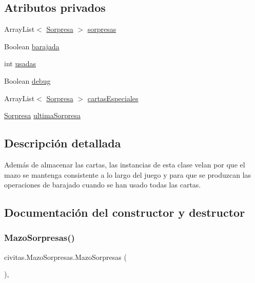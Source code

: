 \subsection*{Atributos privados}
\begin{DoxyCompactItemize}
\item 
Array\+List$<$ \hyperlink{classcivitas_1_1Sorpresa}{Sorpresa} $>$ \hyperlink{classcivitas_1_1MazoSorpresas_a7b0f0b1ab8df542e09240e6e9a4e8f01}{sorpresas}
\item 
Boolean \hyperlink{classcivitas_1_1MazoSorpresas_aec96b369692f1dd8bdffbf76c333ad5f}{barajada}
\item 
int \hyperlink{classcivitas_1_1MazoSorpresas_a49a7af66f4c621ce6b5475bfb6b9090c}{usadas}
\item 
Boolean \hyperlink{classcivitas_1_1MazoSorpresas_a159fe6df17b11fb2f61f9c7e8633a2a8}{debug}
\item 
Array\+List$<$ \hyperlink{classcivitas_1_1Sorpresa}{Sorpresa} $>$ \hyperlink{classcivitas_1_1MazoSorpresas_acd15c95f30ce89bff5b581430f6683ce}{cartas\+Especiales}
\item 
\hyperlink{classcivitas_1_1Sorpresa}{Sorpresa} \hyperlink{classcivitas_1_1MazoSorpresas_a0dd98bd2e61ebb5c4dba17e551c2ceac}{ultima\+Sorpresa}
\end{DoxyCompactItemize}


\subsection{Descripción detallada}
Además de almacenar las cartas, las instancias de esta clase velan por que el mazo se mantenga consistente a lo largo del juego y para que se produzcan las operaciones de barajado cuando se han usado todas las cartas. 

\subsection{Documentación del constructor y destructor}
\mbox{\label{classcivitas_1_1MazoSorpresas_a2a54e95d3d74c8f73f922dc23554af9e}} 
\subsubsection{\texorpdfstring{Mazo\+Sorpresas()}{MazoSorpresas()}\hspace{0.1cm}{\footnotesize\ttfamily [1/2]}}
{\footnotesize\ttfamily civitas.\+Mazo\+Sorpresas.\+Mazo\+Sorpresas (\begin{DoxyParamCaption}{ }\end{DoxyParamCaption})\hspace{0.3cm}{\ttfamily [inline]}, {\ttfamily [package]}}



